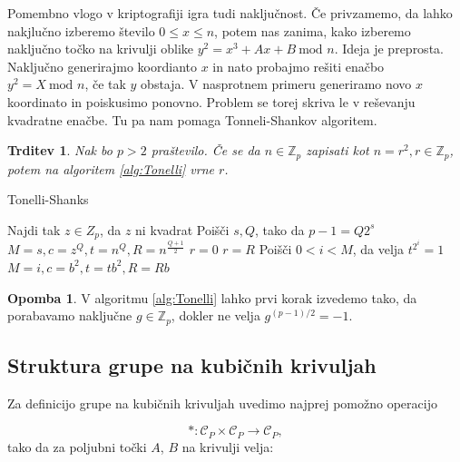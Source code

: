 \documentclass[12pt,a4paper,twoside]{article}
\theoremstyle{definition} %
\newtheorem{opomba}[definicija]{Opomba}
\theoremstyle{plain} %
\newtheorem{trditev}[definicija]{Trditev}
\numberwithin{equation}{section}  %
\newcommand{\Z}{\mathbb Z}
\begin{document}
Pomembno vlogo v kriptografiji igra tudi naključnost. Če privzamemo, da lahko nakjlučno izberemo število $0 \leq x \leq n$, potem nas zanima, kako izberemo naključno točko na krivulji oblike
$y^2 = x^3 +Ax+B \ \text{mod } n$. Ideja je preprosta. Naključno generirajmo koordianto $x$ in nato probajmo rešiti enačbo $y^2 = X \ \text{mod } n$, če tak $y$ obstaja. V nasprotnem primeru generiramo novo $x$ koordinato in poiskusimo ponovno. Problem se torej skriva le v reševanju kvadratne enačbe. Tu pa nam pomaga Tonneli-Shankov algoritem.

\begin{trditev}

Nak bo $p > 2$ praštevilo. Če se da $n \in \Z_p$ zapisati kot $n = r^2, r \in \Z_p$, potem na algoritem \ref{alg:Tonelli} vrne $r$.

\end{trditev}

\begin{algorithm}[H]
\caption[Tonelli]{Tonelli-Shanks}
\label{alg:Tonelli}

\begin{algorithmic}
\State Najdi tak $z \in Z_p$, da $z$ ni kvadrat
\State Poišči $s,Q$, tako da $p-1 = Q2^s$
\State $M = s,c = z^Q,t = n^Q,R=n^{\frac{Q+1}{2}}$
		\State \Return $r=0$
		\State \Return $r=R$
	\Else
		\State Poišči $0<i<M$, da velja $t^{2^i} = 1$
		\State  $M = i,c = b^2,t = tb^2,R=Rb$
	\EndIf
\EndWhile

\end{algorithmic}
\end{algorithm}

\begin{opomba}
V algoritmu \ref{alg:Tonelli} lahko prvi korak izvedemo tako, da porabavamo naključne $g\in \Z_p$, dokler ne velja $g^{(p-1)/2} = -1$.
\end{opomba}


\subsection{Struktura grupe na kubičnih krivuljah}


Za definicijo grupe na kubičnih krivuljah uvedimo najprej pomožno operacijo

$$\ast : \mathcal{C}_P \times \mathcal{C}_P \rightarrow \mathcal{C}_P,$$
tako da za poljubni točki $A$, $B$ na krivulji velja:
\end{document}
